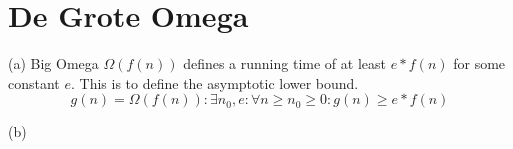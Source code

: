 \section{De Grote Omega}

(a) 
Big Omega $\Omega(f(n))$ defines a running time of at least $e * f(n)$ for some constant $e$. This is to define the asymptotic lower bound. 
\[
    g(n) = \Omega(f(n)) : \exists n_0, e : \forall n \geq n_0 \geq 0 : g(n) \geq e * f(n)
\]

\vspace{10mm}

(b) 
